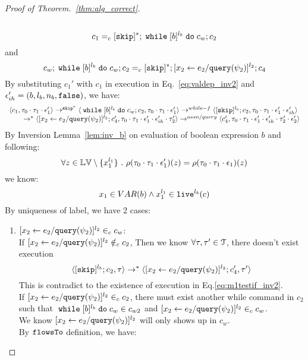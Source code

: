 \begin{proof}[Proof of Theorem.~\ref{thm:alg_correct}]
\begin{case}
\begin{subcase}
\begin{subsubcase}
\begin{subsubsubcase}
\begin{subproof}
\[\begin{array}{l}
  \end{array}
\]
% 
\[
  c_1 =_c [\mathtt{skip}]{}^*; \;\mathtt{while}\; [b]^{l_b} \;\mathtt{do}\; c_w;{c}_2
\]
and
\[
  c_w;\;\mathtt{while}\; [b]^{l_b} \;\mathtt{do}\; c_w; c_2 =_c [\mathtt{skip}]{}^*;[\mathrel{ {x}_2 \leftarrow e_2 / {\tt query}(\psi_2) }]^{l_2};{c}_4
\]
%
By substituting $c_1'$ with $c_1$ in execution in Eq.~\ref{eq:valdep_inv2} and $\mathtt{\epsilon}_{ih}' = (b, l_b, n_b, \mathtt{false})$, we have:
  \[
  \begin{array}{l}   
  \langle c_1, \mathtt{\tau}_0 \cdot \mathtt{\tau}_1 \cdot \mathtt{\epsilon}_1' \rangle 
  \rightarrow^{\mathtt{skip}^*} 
  \langle \;\mathtt{while}\; [b]^{l_b} \;\mathtt{do}\; c_w;{c}_2, \mathtt{\tau}_0 \cdot \mathtt{\tau}_1 \cdot \mathtt{\epsilon}_1' \rangle 
  \rightarrow^{while-f} 
  \langle [\mathtt{skip}]^{l_b};c_2, \mathtt{\tau}_0 \cdot \mathtt{\tau}_1 \cdot \mathtt{\epsilon}_1' \cdot \mathtt{\epsilon}_{ih}' \rangle 
  \\
  \qquad \rightarrow^{*} 
  \langle [\mathrel{ {x}_2 \leftarrow e_2 / {\tt query}(\psi_2) }]^{l_2};{c}_4', 
  \mathtt{\tau}_0 \cdot \mathtt{\tau}_1 \cdot \mathtt{\epsilon}_1' \cdot \mathtt{\epsilon}_{ih}' \cdot \mathtt{\tau}_2' \rangle
  \rightarrow^{assn/query} 
  \langle {c}_4',  \mathtt{\tau}_0 \cdot \mathtt{\tau}_1 \cdot \mathtt{\epsilon}_1' \cdot \mathtt{\epsilon}_{ih}' \cdot \mathtt{\tau}_2' \cdot \mathtt{\epsilon}_2' \rangle 
\end{array}
 \]
By Inversion Lemma~\ref{lem:inv_b} on evaluation of boolean expression $b$ and following: 
\[
  \forall z \in \mathbb{LV} \setminus \{x_1^{l_1}\} ~.~
  \rho(\mathtt{\tau}_0 \cdot \mathtt{\tau}_1 \cdot \mathtt{\epsilon}_1')(z) = \rho(\mathtt{\tau}_0 \cdot \mathtt{\tau}_1 \cdot \mathtt{\epsilon}_1)(z)
\]
we know:
\[
  x_1 \in VAR(b) \land x_1^{l_1} \in \mathtt{live}^{l_b}(c)
\]
%
 By uniqueness of label, we have 2 cases:
 \begin{enumerate}
 \item $[\mathrel{ {x}_2 \leftarrow e_2 / {\tt query}(\psi_2) }]^{l_2} \in_c c_w$:
 \\
 If $[\mathrel{ {x}_2 \leftarrow e_2 / {\tt query}(\psi_2) }]^{l_2} \notin_c c_2$,
 Then we know $\forall \mathtt{\tau}, \mathtt{\tau}' \in \mathcal{T}$, there doesn't exist execution
 \[
  \langle [\mathtt{skip}]^{l_b};c_2, \mathtt{\tau} \rangle \rightarrow^{*} 
  \langle [\mathrel{ {x}_2 \leftarrow e_2 / {\tt query}(\psi_2) }]^{l_2};{c}_4', \mathtt{\tau}' \rangle
 \]
 This is contradict to the existence of execution in Eq.\ref{eq:m1testif_inv2}.
 \\
  If $[\mathrel{ {x}_2 \leftarrow e_2 / {\tt query}(\psi_2) }]^{l_2} \in_c c_2$, there must exist another while command
   in $c_2$ such that 
  $\;\mathtt{while}\; [b]^{l_b} \;\mathtt{do}\; c_w \in c_{w2}$ and $[\mathrel{ {x}_2 \leftarrow e_2 / {\tt query}(\psi_2) }]^{l_2} \in_c c_w$.
  \\
  We know $[\mathrel{ {x}_2 \leftarrow e_2 / {\tt query}(\psi_2) }]^{l_2}$ will only shows up in $c_w$.
  \\
  By $\mathtt{flowsTo}$ definition, we have:

\end{enumerate}
\end{subproof}
\end{subsubsubcase}
\end{subsubcase}
\end{subcase}
\end{case}
\end{proof}
